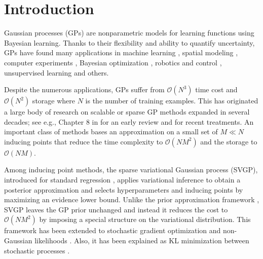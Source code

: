 \section{Introduction}
\label{sec:intro}

Gaussian processes (GPs) are  nonparametric models for learning %
functions using Bayesian learning. Thanks to their flexibility and ability to quantify uncertainty, GPs have found many applications in 
 machine learning \cite{rasmussen2006gaussian}, spatial  modeling \cite{Cressie1993}, computer experiments \cite{OHagan78,gramacy2020surrogates},  Bayesian optimization \cite{Jones1998EfficientGO,garnett_bayesoptbook_2023}, robotics and control \cite{deisenroth2011pilco}, unsupervised learning 
\citep{lawrence2005probabilistic} and  others. 


Despite the numerous applications, GPs  suffer from $\mathcal{O}(N^3)$ time cost  and $\mathcal{O}(N^2)$ storage where  $N$ is the number of training examples. This has originated a large body of research on scalable or sparse GP methods
expanded in several decades; see e.g., Chapter 8 in \citet{rasmussen2006gaussian}  
for an early review and  \citet{heaton2018, LiuetalGPreview20} for recent treatments. 
An important class of methods 
 bases an approximation on a small set of $M \ll  N$ 
inducing points 
\citep{csato-opper-02,lawrence-seeger-herbrich-01, seeger-williams-lawrence-03a,Snelson2006, candela-rasmussen-05,Banerjee2008,Finley2009,titsias2009variational, hensman2013gaussian,Buietal2017,burt2020convergence}
that reduce the time complexity to $\mathcal{O}(N M^2)$ and 
the storage to $\mathcal{O}(N M)$. 

Among inducing point methods, the sparse variational Gaussian process (SVGP), introduced for standard regression \cite{titsias2009variational}, 
applies variational inference to obtain a posterior approximation and selects hyperparameters and inducing points by maximizing an evidence lower bound. Unlike 
the prior approximation framework 
\cite{candela-rasmussen-05}, SVGP
leaves the GP prior unchanged and instead it reduces the cost to $\mathcal{O}(N M^2)$ 
by imposing a special structure on the variational 
distribution. 
This framework has been extended
to stochastic gradient optimization
\cite{hensman2013gaussian} and non-Gaussian likelihoods \cite{Chai12,hensman2015scalable,lloyd15,Dezfouli15,Sheth15}. Also, it has been explained  as KL minimization between stochastic processes 
\cite{Matthews2015OnSV}.

